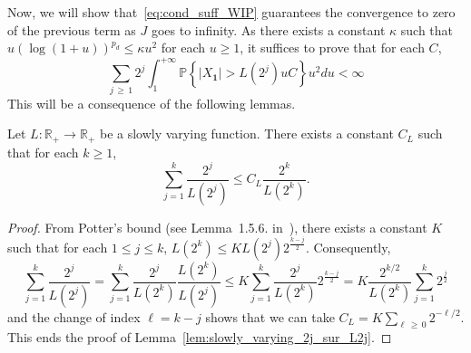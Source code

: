 \documentclass[AHL,Unicode,longabstracts,published]{cedram}
\newcommand\R{\mathbb{R}}
\newcommand\PP{\mathbb{P}}
\newcommand{\pr}[1]{(#1)}
\newcommand{\gr}[1]{\bm{#1}}
\begin{document}
Now, we will show that~\eqref{eq:cond_suff_WIP} guarantees the convergence to zero of the previous term as $J$ goes to infinity. As there exists a constant $\kappa$ such that $u\pr{\log\pr{1+u}}^{p_d}\leq \kappa u^2$ for each $u\geq 1$, it suffices to prove that for each $C$,
\begin{equation}
\sum_{j\,\geq\,1}2^j\int_1^{+\infty}\PP\left\{\left|X_{\gr{1}}\right|>L\left(2^j\right)uC\right\} u^{2}du<\infty
\end{equation}
This will be a consequence of the following lemmas.

\begin{lemm}\label{lem:slowly_varying_2j_sur_L2j}
Let $L\colon \R_{+}\to \R_{+}$ be a slowly varying function. There exists a constant $C_L$ such that for each $k\geq 1$,
\begin{equation}\label{eq:slowly_varying_2j_sur_L2j}
\sum_{j=1}^k\frac{2^j}{L\left(2^j\right)}\leq C_L\frac{2^k}{L\left(2^k\right)}.
\end{equation}
\end{lemm}

\begin{proof}
From Potter's bound (see Lemma~1.5.6. in~\cite{MR1015093}), there exists a constant $K$ such that for each $1\leq j\leq k$, $L\pr{2^k} \leq K L\pr{2^j} 2^{\frac{k-j}2}$. Consequently,
\begin{equation}
\sum_{j=1}^k\frac{2^j}{L\left(2^j\right)} =\sum_{j=1}^k\frac{2^j}{L\left(2^k\right)}\frac{L\left(2^k\right)}{L\left(2^j\right)}\leq K\sum_{j=1}^k\frac{2^j}{L\left(2^k\right)}2^{\frac{k-j}2}=K\frac{2^{k/2}}{L\left(2^k\right)}\sum_{j=1}^k2^{\frac j2}
\end{equation}
and the change of index $\ell=k-j$ shows that we can take $C_L=K\sum_{\ell\,\geq\,0}2^{-\ell/2}$. This ends the proof of Lemma~\ref{lem:slowly_varying_2j_sur_L2j}.
\end{proof}
\end{document}
